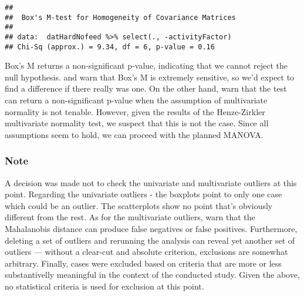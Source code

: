 \documentclass[12pt,]{article}
\newenvironment{Shaded}{\begin{snugshade}}{\end{snugshade}}
\newcommand{\DataTypeTok}[1]{\textcolor[rgb]{0.13,0.29,0.53}{#1}}
\newcommand{\KeywordTok}[1]{\textcolor[rgb]{0.13,0.29,0.53}{\textbf{#1}}}
\newcommand{\NormalTok}[1]{#1}
\newcommand{\OperatorTok}[1]{\textcolor[rgb]{0.81,0.36,0.00}{\textbf{#1}}}
\newcommand{\StringTok}[1]{\textcolor[rgb]{0.31,0.60,0.02}{#1}}
\begin{document}
\begin{Shaded}
\end{Shaded}

\begin{verbatim}
## 
##  Box's M-test for Homogeneity of Covariance Matrices
## 
## data:  datHardNofeed %>% select(., -activityFactor)
## Chi-Sq (approx.) = 9.34, df = 6, p-value = 0.16
\end{verbatim}

Box's M returns a non-significant p-value, indicating that we cannot
reject the null hypothesis. \citet{field_discovering_2012} and
\citet{raykov_introduction_2008} warn that Box's M is extremely
sensitive, so we'd expect to find a difference if there really was one.
On the other hand, \citet{field_discovering_2012} warn that the test can
return a non-significant p-value when the assumption of multivariate
normality is not tenable. However, given the results of the
Henze-Zirkler multivariate normality test, we suspect that this is not
the case. Since all assumptions seem to hold, we can proceed with the
planned MANOVA.

\hypertarget{note}{%
\subsubsection{Note}\label{note}}

A decision was made not to check the univariate and multivariate
outliers at this point. Regarding the univariate outliers - the boxplots
point to only one case which could be an outlier. The scatterplots show
no point that's obviously different from the rest. As for the
multivariate outliers, \citet{tabachnick_using_2012} warn that the
Mahalanobis distance can produce false negatives or false positives.
Furthermore, deleting a set of outliers and rerunning the analysis can
reveal yet another set of outliers --- without a clear-cut and absolute
criterion, exclusions are somewhat arbitrary. Finally, cases were
excluded based on criteria that are more or less substantivelly
meaningful in the context of the conducted study. Given the above, no
statistical criteria is used for exclusion at this point.
\end{document}
